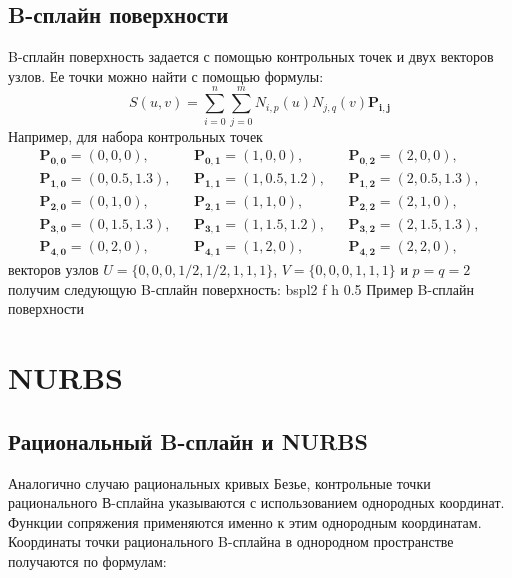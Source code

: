 \documentclass{bmstu}
\begin{document}
\subsection{B-сплайн поверхности}

B-сплайн поверхность задается с помощью контрольных точек и двух векторов узлов. Ее точки можно найти с помощью формулы:
\begin{equation}
    S(u, v) = \sum\limits_{i=0}^n\sum\limits_{j=0}^m N_{i,p}(u)N_{j,q}(v)\mathbf{P_{i,j}}
\end{equation}
Например, для набора контрольных точек
\begin{equation*}
    \begin{matrix}

        \mathbf{P_{0,0}}=(0,0,0),     &  & \mathbf{P_{0,1}}=(1,0,0),       &  & \mathbf{P_{0,2}}=(2,0,0),     \\
        \mathbf{P_{1,0}}=(0,0.5,1.3), &  & \mathbf{P_{1,1}}=(1,0.5,1.2)  , &  & \mathbf{P_{1,2}}=(2,0.5,1.3), \\
        \mathbf{P_{2,0}}=(0,1,0)    , &  & \mathbf{P_{2,1}}=(1,1,0)      , &  & \mathbf{P_{2,2}}=(2,1,0)    , \\
        \mathbf{P_{3,0}}=(0,1.5,1.3), &  & \mathbf{P_{3,1}}=(1,1.5,1.2)  , &  & \mathbf{P_{3,2}}=(2,1.5,1.3), \\
        \mathbf{P_{4,0}}=(0,2,0)    , &  & \mathbf{P_{4,1}}=(1,2,0)      , &  & \mathbf{P_{4,2}}=(2,2,0)    ,
    \end{matrix}
\end{equation*}
векторов узлов $U = \{0,0,0,1/2,1/2,1,1,1\}$, $V = \{0,0,0,1,1,1\}$ и $p=q=2$ получим следующую B-сплайн поверхность:
{bspl2} %
{f} %
{h} %
{0.5\textwidth} %
{Пример B-сплайн поверхности} %
\newpage
\section{NURBS}
\subsection{Рациональный B-сплайн и NURBS}
Аналогично случаю рациональных кривых Безье, контрольные точки
рационального В-сплайна указываются с использованием однородных
координат. Функции сопряжения применяются именно к этим однородным
координатам. Координаты точки рационального B-сплайна в однородном
пространстве получаются по формулам:
\end{document}
